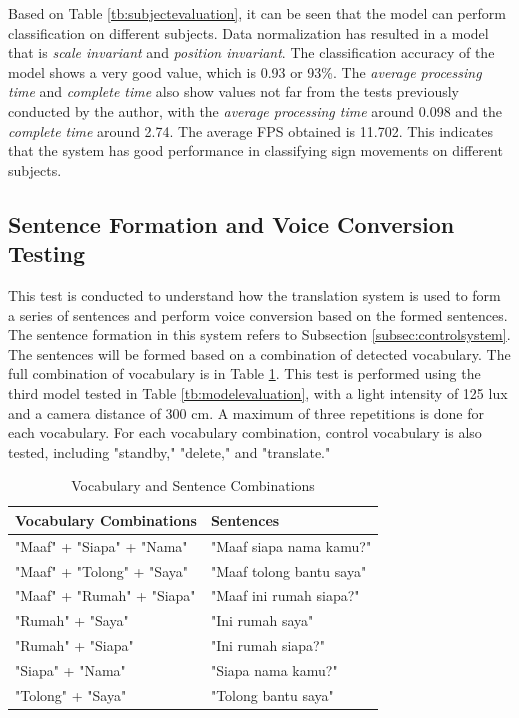 Based on Table \ref{tb:subjectevaluation}, it can be seen that the model can perform classification on different subjects. Data normalization has resulted in a model that is \emph{scale invariant} and \emph{position invariant}. The classification accuracy of the model shows a very good value, which is 0.93 or 93\%. The \emph{average processing time} and \emph{complete time} also show values not far from the tests previously conducted by the author, with the \emph{average processing time} around 0.098 and the \emph{complete time} around 2.74. The average FPS obtained is 11.702. This indicates that the system has good performance in classifying sign movements on different subjects.

\subsection{Sentence Formation and Voice Conversion Testing}
\label{sec:sentenceanalysis}

This test is conducted to understand how the translation system is used to form a series of sentences and perform voice conversion based on the formed sentences. The sentence formation in this system refers to Subsection \ref{subsec:controlsystem}. The sentences will be formed based on a combination of detected vocabulary. The full combination of vocabulary is in Table \ref{tb:vocabularycombination}. This test is performed using the third model tested in Table \ref{tb:modelevaluation}, with a light intensity of 125 lux and a camera distance of 300 cm. A maximum of three repetitions is done for each vocabulary. For each vocabulary combination, control vocabulary is also tested, including "standby," "delete," and "translate."

\begin{table}[H]
  \caption{Vocabulary and Sentence Combinations}
  \label{tb:vocabularycombination}
  \centering
  \begin{tabular}{ll}
    \hline
    \textbf{Vocabulary Combinations} & \textbf{Sentences} \\
    \hline
    "Maaf" + "Siapa" + "Nama" & "Maaf siapa nama kamu?" \\
    "Maaf" + "Tolong" + "Saya" & "Maaf tolong bantu saya" \\
    "Maaf" + "Rumah" + "Siapa" & "Maaf ini rumah siapa?" \\
    "Rumah" + "Saya" & "Ini rumah saya" \\
    "Rumah" + "Siapa" & "Ini rumah siapa?" \\
    "Siapa" + "Nama" & "Siapa nama kamu?" \\
    "Tolong" + "Saya" & "Tolong bantu saya" \\
    \hline
  \end{tabular}
\end{table}

